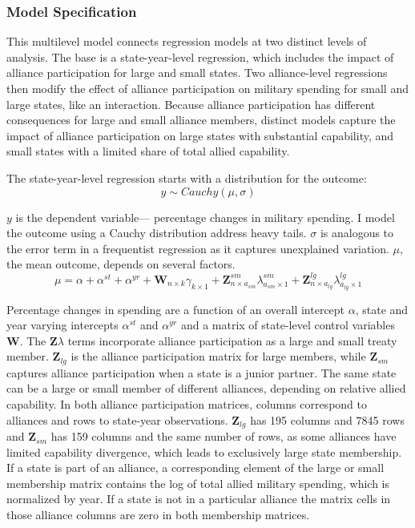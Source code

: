 \documentclass[12pt]{article}
\begin{document}
\subsubsection{Model Specification} 

This multilevel model connects regression models at two distinct levels of analysis. 
The base is a state-year-level regression, which includes the impact of alliance participation for large and small states.
Two alliance-level regressions then modify the effect of alliance participation on military spending for small and large states, like an interaction. 
Because alliance participation has different consequences for large and small alliance members, distinct models capture the impact of alliance participation on large states with substantial capability, and small states with a limited share of total allied capability. 


The state-year-level regression starts with a distribution for the outcome:
\begin{equation}
y \sim Cauchy(\mu, \sigma)
\end{equation}
 

$y$ is the dependent variable--- percentage changes in military spending. 
I model the outcome using a Cauchy distribution address heavy tails.
$\sigma$ is analogous to the error term in a frequentist regression as it captures unexplained variation.  
$\mu$, the mean outcome, depends on several factors.
\begin{equation}
\mu = \alpha + \alpha^{st} + \alpha^{yr} +\textbf{W}_{n \times k} \gamma_{k \times 1} + \textbf{Z}^{sm}_{n \times a_{sm}} \lambda^{sm}_{a_{sm} \times 1} + \textbf{Z}^{lg}_{n \times a_{lg}} \lambda^{lg}_{a_{lg} \times 1} 
\end{equation}


Percentage changes in spending are a function of an overall intercept $\alpha$, state and year varying intercepts $\alpha^{st}$ and $\alpha^{yr}$ and a matrix of state-level control variables $\textbf{W}$.
The $\textbf{Z} \lambda$ terms incorporate alliance participation as a large and small treaty member. 
$\textbf{Z}_{lg}$ is the alliance participation matrix for large members, while $\textbf{Z}_{sm}$ captures alliance participation when a state is a junior partner. 
The same state can be a large or small member of different alliances, depending on relative allied capability. 
In both alliance participation matrices, columns correspond to alliances and rows to state-year observations. 
$\textbf{Z}_{lg}$ has 195 columns and 7845 rows and $\textbf{Z}_{sm}$ has 159 columns and the same number of rows, as some alliances have limited capability divergence, which leads to exclusively large state membership. 
If a state is part of an alliance, a corresponding element of the large or small membership matrix contains the log of total allied military spending, which is normalized by year.
If a state is not in a particular alliance the matrix cells in those alliance columns are zero in both membership matrices.
\end{document}
